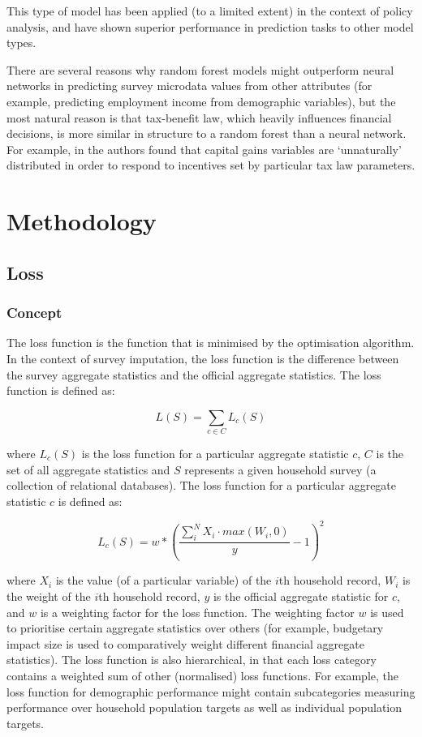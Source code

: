 \documentclass[10pt,journal,compsoc]{IEEEtran}
\begin{document}
This type of model has been applied (to a limited extent) in the context of policy analysis, and have shown superior performance in prediction tasks to other model types\cite{ecb}.

There are several reasons why random forest models might outperform neural networks in predicting survey microdata values from other attributes (for example, predicting employment income from demographic variables), but the most natural reason is that tax-benefit law, which heavily influences financial decisions, is more similar in structure to a random forest than a neural network. For example, in \cite{cg_bunching} the authors found that capital gains variables are `unnaturally' distributed in order to respond to incentives set by particular tax law parameters.

\section{Methodology}



\subsection{Loss}

\subsubsection{Concept}

The loss function is the function that is minimised by the optimisation algorithm. In the context of survey imputation, the loss function is the difference between the survey aggregate statistics and the official aggregate statistics. The loss function is defined as:

\begin{equation}
  L(S) = \sum_{c \in C} L_c(S)
\end{equation}

where $L_c(S)$ is the loss function for a particular aggregate statistic $c$, $C$ is the set of all aggregate statistics and $S$ represents a given household survey (a collection of relational databases). The loss function for a particular aggregate statistic $c$ is defined as:

\begin{equation}
  L_c(S) = w * (\frac{\sum_i^{N} X_i \cdot max(W_i, 0)}{y} - 1) ^ 2
\end{equation}

where $X_i$ is the value (of a particular variable) of the $i$th household record, $W_i$ is the weight of the $i$th household record, $y$ is the official aggregate statistic for $c$, and $w$ is a weighting factor for the loss function. The weighting factor $w$ is used to prioritise certain aggregate statistics over others (for example, budgetary impact size is used to comparatively weight different financial aggregate statistics). The loss function is also hierarchical, in that each loss category contains a weighted sum of other (normalised) loss functions. For example, the loss function for demographic performance might contain subcategories measuring performance over household population targets as well as individual population targets.
\end{document}
